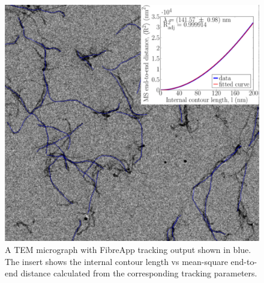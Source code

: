\begin{figure}[!ht]
    \centering
    \noindent\includegraphics[width=0.7\linewidth]{Figures/chapter-temsaxs/fibreAppTrackingImage_subplot.pdf}
    \caption{A TEM micrograph with FibreApp tracking output shown in blue. The insert shows the internal contour length vs mean-square end-to-end distance calculated from the corresponding tracking parameters.}\label{fig:fig5}
\end{figure}


